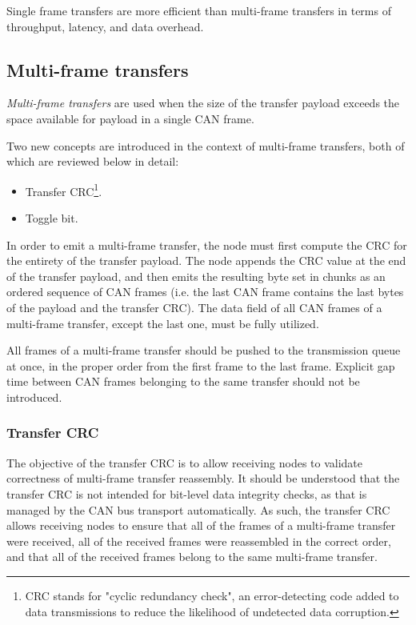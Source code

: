 Single frame transfers are more efficient than multi-frame transfers in terms of throughput, latency,
and data overhead.

\subsection{Multi-frame transfers}

\emph{Multi-frame transfers} are used when the size of the transfer payload exceeds the space available
for payload in a single CAN frame.

Two new concepts are introduced in the context of multi-frame transfers, both of which are reviewed below in detail:
\begin{itemize}
    \item Transfer CRC\footnote{CRC stands for "cyclic redundancy check", an error-detecting code
    added to data transmissions to reduce the likelihood of undetected data corruption.}.
    \item Toggle bit.
\end{itemize}

In order to emit a multi-frame transfer, the node must first compute the CRC for the entirety of the transfer payload.
The node appends the CRC value at the end of the transfer payload,
and then emits the resulting byte set in chunks as an ordered sequence of CAN frames
(i.e. the last CAN frame contains the last bytes of the payload and the transfer CRC).
The data field of all CAN frames of a multi-frame transfer, except the last one, must be fully utilized.

All frames of a multi-frame transfer should be pushed to the transmission queue at once,
in the proper order from the first frame to the last frame.
Explicit gap time between CAN frames belonging to the same transfer should not be introduced.

\subsubsection{Transfer CRC}

The objective of the transfer CRC is to allow receiving nodes to validate correctness of
multi-frame transfer reassembly.
It should be understood that the transfer CRC is not intended for bit-level data integrity checks,
as that is managed by the CAN bus transport automatically.
As such, the transfer CRC allows receiving nodes to ensure that all of the frames of a multi-frame
transfer were received, all of the received frames were reassembled in the correct order,
and that all of the received frames belong to the same multi-frame transfer.

